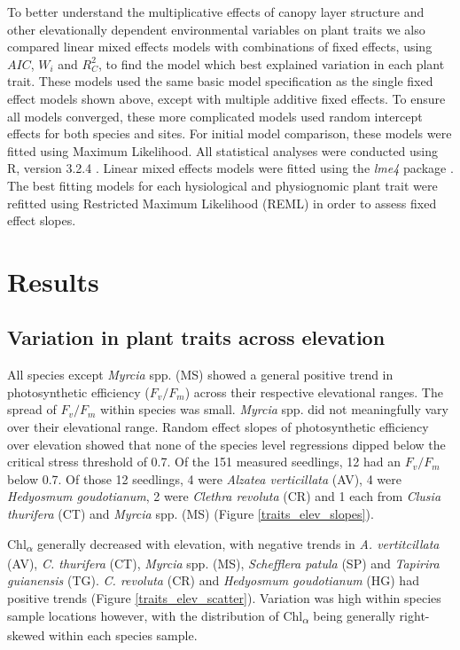 \documentclass[a4paper, 11pt]{article}
\begin{document}
To better understand the multiplicative effects of canopy layer structure and other elevationally dependent environmental variables on plant traits we also compared linear mixed effects models with combinations of fixed effects, using $AIC$, $W_i$ and $R_C^2$, to find the model which best explained variation in each plant trait. These models used the same basic model specification as the single fixed effect models shown above, except with multiple additive fixed effects. To ensure all models converged, these more complicated models used random intercept effects for both species and sites. For initial model comparison, these models were fitted using Maximum Likelihood. All statistical analyses were conducted using R, version 3.2.4 \citep{R2019}. Linear mixed effects models were fitted using the \textit{lme4} package \citep{Bates2015}. The best fitting models for each hysiological and physiognomic plant trait were refitted using Restricted Maximum Likelihood (REML) in order to assess fixed effect slopes.

\section{Results}

\subsection{Variation in plant traits across elevation}

All species except \textit{Myrcia} spp. (MS) showed a general positive trend in photosynthetic efficiency ($F_v/F_m$) across their respective elevational ranges. The spread of $F_v/F_m$ within species was small. \textit{Myrcia} spp. did not meaningfully vary over their elevational range. Random effect slopes of photosynthetic efficiency over elevation showed that none of the species level regressions dipped below the critical stress threshold of 0.7. Of the 151 measured seedlings, 12 had an $F_v/F_m$ below 0.7. Of those 12 seedlings, 4 were \textit{Alzatea verticillata} (AV), 4 were \textit{Hedyosmum goudotianum}, 2 were  \textit{Clethra revoluta} (CR) and 1 each from \textit{Clusia thurifera} (CT) and \textit{Myrcia} spp. (MS) (Figure \ref{traits_elev_slopes}). 

Chl\textsubscript{$\alpha$} generally decreased with elevation, with negative trends in \textit{A. vertitcillata} (AV), \textit{C. thurifera} (CT), \textit{Myrcia} spp. (MS), \textit{Schefflera patula} (SP) and \textit{Tapirira guianensis} (TG). \textit{C. revoluta} (CR)  and \textit{Hedyosmum goudotianum} (HG) had positive trends (Figure \ref{traits_elev_scatter}). Variation was high within species sample locations however, with the distribution of Chl\textsubscript{$\alpha$} being generally right-skewed within each species sample.
\end{document}
